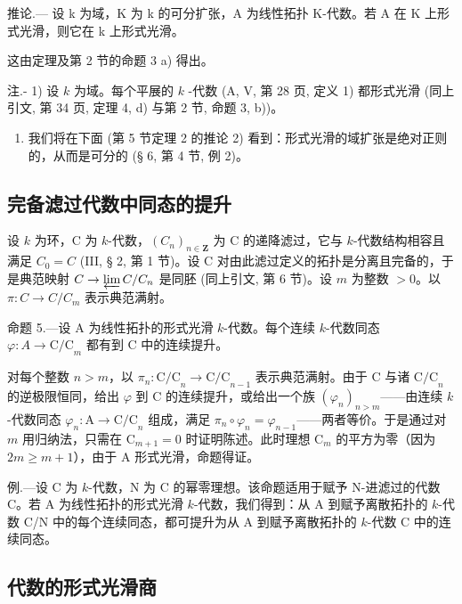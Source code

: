 推论.--- 设 k 为域，K 为 k 的可分扩张，A 为线性拓扑 K-代数。若 A 在 K 上形式光滑，则它在 k 上形式光滑。

这由定理及第 2 节的命题 3 a) 得出。

注.- 1) 设 \(k\) 为域。每个平展的 \(k\) -代数 (A, V, 第 28 页, 定义 1) 都形式光滑 (同上引文, 第 34 页, 定理 4, d) 与第 2 节, 命题 3, b))。

\begin{enumerate}
\def\labelenumi{\arabic{enumi})}
\setcounter{enumi}{1}
\tightlist
\item
  我们将在下面 (第 5 节定理 2 的推论 2) 看到：形式光滑的域扩张是绝对正则的，从而是可分的 (§ 6, 第 4 节, 例 2)。
\end{enumerate}

\subsection{完备滤过代数中同态的提升}

设 \(k\) 为环，C 为 \(k\)-代数，\((C_n)_{n \in \mathbf{Z}}\) 为 C 的递降滤过，它与 \(k\)-代数结构相容且满足 \(C_0 = C\) (III, § 2, 第 1 节)。设 C 对由此滤过定义的拓扑是分离且完备的，于是典范映射 \(C \to \varprojlim C / C_n\) 是同胚 (同上引文, 第 6 节)。设 \(m\) 为整数 \(>0\)。以 \(\pi: C \to C / C_m\) 表示典范满射。

命题 5.—设 A 为线性拓扑的形式光滑 \(k\)-代数。每个连续 \(k\)-代数同态 \(\varphi: A \to \mathrm{C/C}_{m}\) 都有到 C 中的连续提升。

对每个整数 \(n > m\)，以 \(\pi_n: \mathrm{C/C}_n \to \mathrm{C/C}_{n-1}\) 表示典范满射。由于 C 与诸 \(\mathrm{C/C}_n\) 的逆极限恒同，给出 \(\varphi\) 到 C 的连续提升，或给出一个族 \((\varphi_n)_{n > m}\)——由连续 \(k\)-代数同态 \(\varphi_n: \mathrm{A} \to \mathrm{C/C}_n\) 组成，满足 \(\pi_n \circ \varphi_n = \varphi_{n-1}\)——两者等价。于是通过对 \(m\) 用归纳法，只需在 \(\mathrm{C}_{m+1} = 0\) 时证明陈述。此时理想 \(\mathrm{C}_m\) 的平方为零（因为 \(2m \geqslant m+1\)），由于 A 形式光滑，命题得证。

例.—设 C 为 \(k\)-代数，N 为 C 的幂零理想。该命题适用于赋予 N-进滤过的代数 C。若 A 为线性拓扑的形式光滑 \(k\)-代数，我们得到：从 A 到赋予离散拓扑的 \(k\)-代数 C/N 中的每个连续同态，都可提升为从 A 到赋予离散拓扑的 \(k\)-代数 C 中的连续同态。

\subsection{代数的形式光滑商}

